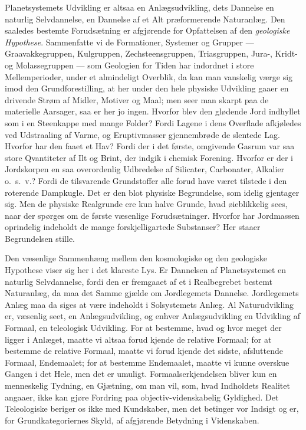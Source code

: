 \documentclass[12pt]{book}
\newcommand{\apage}[1]{\marginnote{\footnotesize\textit{[#1]}}}
\begin{document}
Planetsystemets Udvikling er altsaa en Anlægsudvikling, dets Dannelse en
naturlig Selvdannelse, en Dannelse af et Alt præformerende Naturanlæg. Den
saaledes bestemte Forudsætning er afgjørende for Opfattelsen af den
\emph{geologiske Hypothese}. Sammenfatte vi de Formationer, Systemer og Grupper
--- Graavakkegruppen, Kulgruppen, Zechsteensgruppen, Triasgruppen, Jura-, Kridt-
og Molassegruppen --- som Geologien for Tiden har indordnet i store
Mellemperioder, under et almindeligt Overblik, da kan man vanskelig værge
sig imod den Grundforestilling, at her under den hele physiske Udvikling
gaaer en drivende Strøm af Midler, Motiver og Maal; men seer man skarpt paa
de materielle Aarsager, saa er her jo ingen. Hvorfor blev den glødende Jord
indhyllet som i en Steenkappe med mange Folder? Fordi Lagene i dens
Overflade afkjøledes ved Udstraaling af Varme, og Eruptivmasser
gjennembrøde de slentede Lag. Hvorfor har den faaet \apage{170} et Hav? Fordi der i det
første, omgivende Gasrum var saa store Qvantiteter af Ilt og Brint, der
indgik i chemisk Forening. Hvorfor er der i Jordskorpen en saa overordenlig
Udbredelse af Silicater, Carbonater, Alkalier o.\ s.\ v.? Fordi de tilsvarende
Grundstoffer alle forud have været tilstede i den roterende Dampkugle. Det
er den blot physiske Begrundelse, som idelig gjentager sig. Men de physiske
Realgrunde ere kun halve Grunde, hvad øieblikkelig sees, naar der spørges
om de første væsenlige Forudsætninger. Hvorfor har Jordmassen oprindelig
indeholdt de mange forskjelligartede Substanser? Her staaer Begrundelsen
stille.

Den væsenlige Sammenhæng mellem den kosmologiske og den geologiske
Hypothese viser sig her i det klareste Lys. Er Dannelsen af Planetsystemet
en naturlig Selvdannelse, fordi den er fremgaaet af et i Realbegrebet
bestemt Naturanlæg, da maa det Samme gjælde om Jordlegemets Dannelse.
Jordlegemets Anlæg maa da siges at være indeholdt i Solsystemets Anlæg. Al
Naturudvikling er, væsenlig seet, en Anlægsudvikling, og enhver
Anlægsudvikling en Udvikling af Formaal, en teleologisk Udvikling. For at
bestemme, hvad og hvor meget der ligger i Anlæget, maatte vi altsaa forud
kjende de relative Formaal; for at bestemme de relative Formaal, maatte vi
forud kjende det sidste, afsluttende Formaal, Endemaalet; for at bestemme
Endemaalet, maatte vi kunne overskue Gangen i det Hele, men det er umuligt.
Formaalserkjendelsen bliver kun en menneskelig Tydning, en Gjætning, om man
vil, som, hvad Indholdets Realitet \apage{171} angaaer, ikke kan gjøre Fordring paa
objectiv-videnskabelig Gyldighed. Det Teleologiske beriger os ikke med
Kundskaber, men det betinger vor Indsigt og er, for Grundkategoriernes
Skyld, af afgjørende Betydning i Videnskaben.
\end{document}
